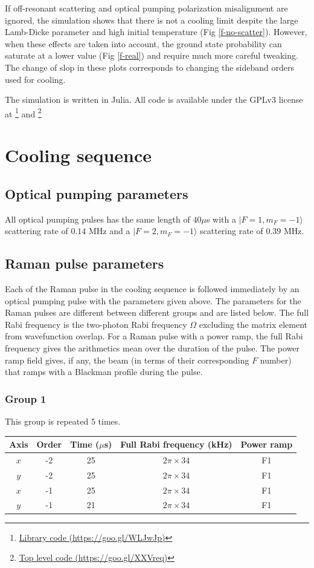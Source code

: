 \documentclass[aps,secnumarabic,amsmath,amssymb]{revtex4}
\begin{document}
If off-resonant scattering and optical pumping polarization misalignment are ignored,
the simulation shows that there is not a cooling limit
despite the large Lamb-Dicke parameter and high initial temperature (Fig \ref{f-no-scatter}).
However, when these effects are taken into account, the ground state probability can saturate at
a lower value (Fig \ref{f-real}) and require much more careful tweaking.
The change of slop in these plots corresponds to changing the sideband orders used for cooling.

The simulation is written in Julia\cite{Bezanson2017}.
All code is available under the GPLv3 license at
\footnote{\href{https://goo.gl/WLJwJp}{Library code (https://goo.gl/WLJwJp)}} and
\footnote{\href{https://goo.gl/XXVreq}{Top level code (https://goo.gl/XXVreq)}}

\section{Cooling sequence}

\subsection{Optical pumping parameters}
All optical pumping pulses has the same length of $40\mu$s
with a $|F=1,m_F=-1\rangle$ scattering rate of $0.14$ MHz
and a $|F=2,m_F=-1\rangle$ scattering rate of $0.39$ MHz.

\subsection{Raman pulse parameters}
Each of the Raman pulse in the cooling sequence is followed immediately by an optical pumping
pulse with the parameters given above.
The parameters for the Raman pulses are different between different groups and are listed below.
The full Rabi frequency is the two-photon Rabi frequency $\Omega$ excluding the matrix element
from wavefunction overlap.
For a Raman pulse with a power ramp,
the full Rabi frequency gives the arithmetics mean over the duration of the pulse.
The power ramp field gives, if any,
the beam (in terms of their corresponding $F$ number)
that ramps with a Blackman profile during the pulse.
\subsubsection{Group 1}
This group is repeated 5 times.
\begin{center}
  \begin{tabular}{|c|c|c|c|c|}
    \hline
    Axis&Order&Time ($\mu$s)&Full Rabi frequency (kHz)&Power ramp\\\hline
    $x$&-2&25&$2\pi\times34$&F1\\\hline
    $y$&-2&25&$2\pi\times34$&F1\\\hline
    $x$&-1&25&$2\pi\times34$&F1\\\hline
    $y$&-1&21&$2\pi\times34$&F1\\\hline
  \end{tabular}
\end{center}
\end{document}
